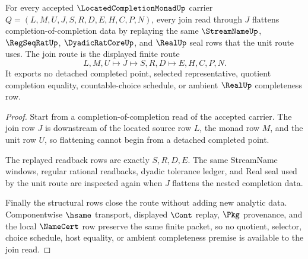\begin{theorem}
\label{thm:located-completion-monad-join-exactness}
For every accepted $\LocatedCompletionMonadUp$ carrier
$Q=(L,M,U,J,S,R,D,E,H,C,P,N)$, every join read through $J$ flattens
completion-of-completion data by replaying the same $\StreamNameUp$,
$\RegSeqRatUp$, $\DyadicRatCoreUp$, and $\RealUp$ seal rows that the unit route
uses. The join route is the displayed finite route
$$
L,M,U \longmapsto J \longmapsto S,R,D \longmapsto E,H,C,P,N .
$$
It exports no detached completed point, selected representative, quotient
completion equality, countable-choice schedule, or ambient $\RealUp$
completeness row.
\end{theorem}
\begin{proof}
Start from a completion-of-completion read of the accepted carrier. The join
row $J$ is downstream of the located source row $L$, the monad row $M$, and the
unit row $U$, so flattening cannot begin from a detached completed point.

The replayed readback rows are exactly $S,R,D,E$. The same StreamName windows,
regular rational readbacks, dyadic tolerance ledger, and Real seal used by the
unit route are inspected again when $J$ flattens the nested completion data.

Finally the structural rows close the route without adding new analytic data.
Componentwise $\hsame$ transport, displayed $\Cont$ replay, $\Pkg$ provenance,
and the local $\NameCert$ row preserve the same finite packet, so no quotient,
selector, choice schedule, host equality, or ambient completeness premise is
available to the join read.
\end{proof}


